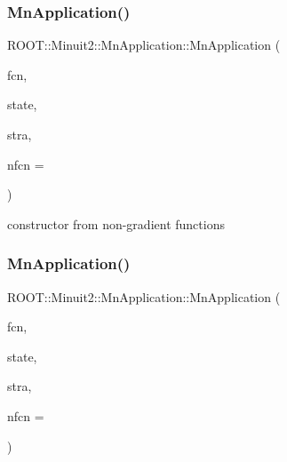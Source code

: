 \mbox{\label{classROOT_1_1Minuit2_1_1MnApplication_ac3bea3d025068f8bc7d8a6701f23aa81}} 
\subsubsection{\texorpdfstring{MnApplication()}{MnApplication()}\hspace{0.1cm}{\footnotesize\ttfamily [5/6]}}
{\footnotesize\ttfamily R\+O\+O\+T\+::\+Minuit2\+::\+Mn\+Application\+::\+Mn\+Application (\begin{DoxyParamCaption}\item[{const \mbox{\hyperlink{classROOT_1_1Minuit2_1_1FCNBase}{F\+C\+N\+Base}} \&}]{fcn,  }\item[{const \mbox{\hyperlink{classROOT_1_1Minuit2_1_1MnUserParameterState}{Mn\+User\+Parameter\+State}} \&}]{state,  }\item[{const \mbox{\hyperlink{classROOT_1_1Minuit2_1_1MnStrategy}{Mn\+Strategy}} \&}]{stra,  }\item[{unsigned int}]{nfcn = {} }\end{DoxyParamCaption})}



constructor from non-\/gradient functions 

\mbox{\label{classROOT_1_1Minuit2_1_1MnApplication_a07b6eb3c240c0d2360d466ab1f1a85ec}} 
\subsubsection{\texorpdfstring{MnApplication()}{MnApplication()}\hspace{0.1cm}{\footnotesize\ttfamily [6/6]}}
{\footnotesize\ttfamily R\+O\+O\+T\+::\+Minuit2\+::\+Mn\+Application\+::\+Mn\+Application (\begin{DoxyParamCaption}\item[{const \mbox{\hyperlink{classROOT_1_1Minuit2_1_1FCNGradientBase}{F\+C\+N\+Gradient\+Base}} \&}]{fcn,  }\item[{const \mbox{\hyperlink{classROOT_1_1Minuit2_1_1MnUserParameterState}{Mn\+User\+Parameter\+State}} \&}]{state,  }\item[{const \mbox{\hyperlink{classROOT_1_1Minuit2_1_1MnStrategy}{Mn\+Strategy}} \&}]{stra,  }\item[{unsigned int}]{nfcn = {} }\end{DoxyParamCaption})}



